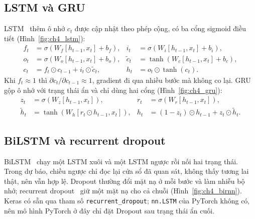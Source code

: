 
\subsection{LSTM và GRU}
LSTM~\cite{hochreiter1997} thêm ô nhớ $c_t$ được cập nhật theo phép cộng, có ba cổng sigmoid điều tiết (Hình~\ref{fig:ch4_lstm}):
\begin{equation}
\begin{aligned}
f_t&=\sigma(W_f[h_{t-1},x_t]+b_f), & i_t&=\sigma(W_i[h_{t-1},x_t]+b_i),\\
o_t&=\sigma(W_o[h_{t-1},x_t]+b_o), & \tilde c_t&=\tanh(W_c[h_{t-1},x_t]+b_c),\\
c_t&=f_t\odot c_{t-1}+i_t\odot\tilde c_t, & h_t&=o_t\odot\tanh(c_t).
\end{aligned}
\end{equation}
Khi $f_t\approx 1$ thì $\partial c_t/\partial c_{t-1}\approx 1$, gradient đi qua nhiều bước mà không co lại. GRU~\cite{cho2014} gộp ô nhớ với trạng thái ẩn và chỉ dùng hai cổng (Hình~\ref{fig:ch4_gru}):
\begin{equation}
\begin{aligned}
z_t&=\sigma(W_z[h_{t-1},x_t]), & r_t&=\sigma(W_r[h_{t-1},x_t]),\\
\tilde h_t&=\tanh(W_h[r_t\odot h_{t-1},x_t]), & h_t&=(1-z_t)\odot h_{t-1}+z_t\odot\tilde h_t .
\end{aligned}
\end{equation}


\subsection{BiLSTM và recurrent dropout}
BiLSTM~\cite{schuster1997} chạy một LSTM xuôi và một LSTM ngược rồi nối hai trạng thái. Trong dự báo, chiều ngược chỉ đọc lại cửa sổ đã quan sát, không thấy tương lai thật, nên vẫn hợp lệ. Dropout thường đổi mặt nạ ở mỗi bước và làm nhiễu bộ nhớ; recurrent dropout~\cite{gal2016} giữ một mặt nạ cho cả chuỗi (Hình~\ref{fig:ch4_birnn}). Keras có sẵn qua tham số \texttt{recurrent\_dropout}; \texttt{nn.LSTM} của PyTorch không có, nên mô hình PyTorch ở đây chỉ đặt Dropout sau trạng thái ẩn cuối.




